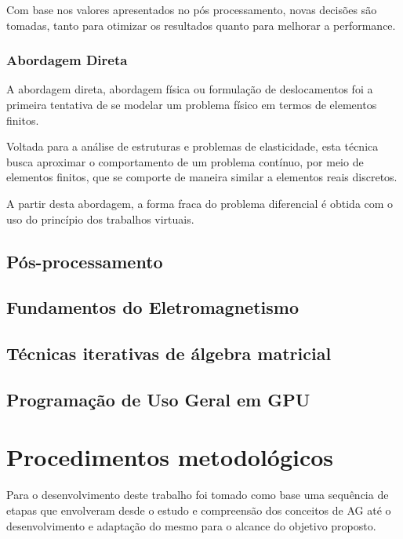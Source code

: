 \documentclass[
    12pt,               %
    openright,          %
    oneside,
    a4paper,            %
    english,            %
    french,             %
    spanish,            %
    brazil              %
    ]{abntex2}
\begin{document}
Com base nos valores apresentados no pós processamento, novas decisões são tomadas, tanto para otimizar os resultados quanto para melhorar a performance.

\subsection{Abordagem Direta \\}

A abordagem direta, abordagem física ou formulação de deslocamentos foi a primeira tentativa de se modelar um problema físico em termos de elementos finitos.

Voltada para a análise de estruturas e problemas de elasticidade, esta técnica busca aproximar o comportamento de um problema contínuo, por meio de elementos finitos, que se comporte de maneira similar a elementos reais discretos.
\cite[p. 19]{zien}

A partir desta abordagem, a forma fraca do problema diferencial é obtida com o uso do princípio dos trabalhos virtuais.
\cite[p. 20]{zien}

 
\section{Pós-processamento}
\label{sec:posProc}

\section{Fundamentos do Eletromagnetismo}
\label{sec:eletromag}


\section{Técnicas iterativas de álgebra matricial}
\label{sec:tecItera}



\section{Programação de Uso Geral em GPU}
\label{sec:GPGPU}




\chapter{Procedimentos metodológicos}
Para o desenvolvimento deste trabalho foi tomado como base uma sequência de etapas que envolveram desde o estudo e compreensão dos conceitos de AG até o desenvolvimento e adaptação do mesmo para o alcance do objetivo proposto.
\end{document}
